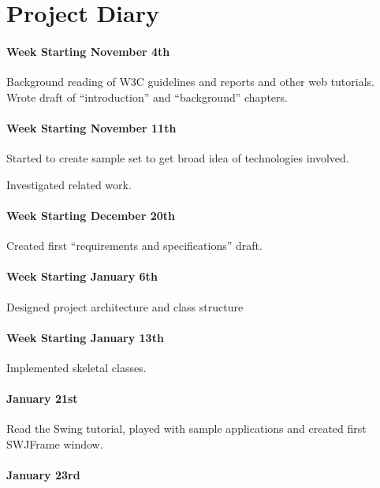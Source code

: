 
\setlength{\parindent}{0em}

\chapter{Project Diary}

\subsubsection{Week Starting November 4th}

Background reading of W3C guidelines and reports and other web
tutorials. Wrote draft of ``introduction'' and ``background'' chapters.

\subsubsection{Week Starting November 11th}

Started to create sample set to get broad idea of technologies
involved.

Investigated related work.

\subsubsection{Week Starting December 20th}

Created first ``requirements and specifications'' draft.

\subsubsection{Week Starting January 6th}

Designed project architecture and class structure

\subsubsection{Week Starting January 13th}

Implemented skeletal classes.

\subsubsection{January 21st}

Read the Swing tutorial, played with sample applications and created
first SWJFrame window.

\subsubsection{January 23rd}

